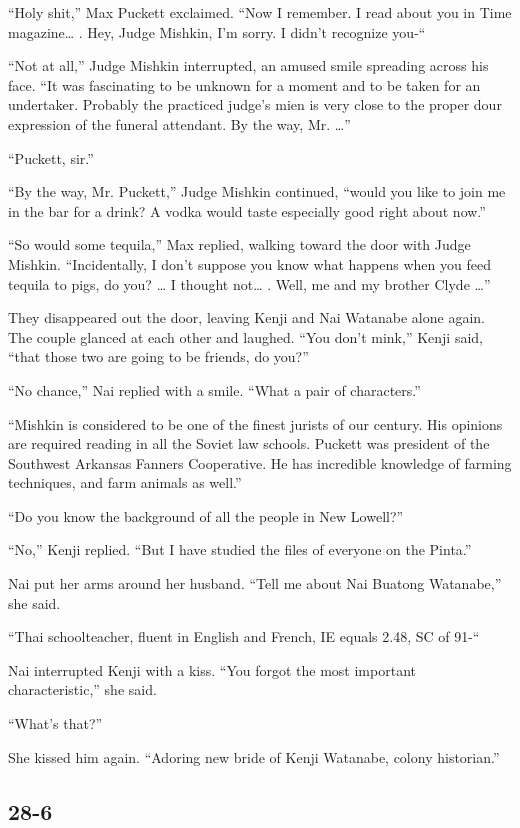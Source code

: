 \documentclass[]{article}
\begin{document}
{“Holy shit,” Max Puckett exclaimed. “Now I remember. I read about you in Time magazine… . Hey, Judge Mishkin, I’m sorry. I didn’t recognize you-“

“Not at all,” Judge Mishkin interrupted, an amused smile spreading across his face. “It was fascinating to be unknown for a moment and to be taken for an undertaker. Probably the practiced judge’s mien is very close to the proper dour expression of the funeral attendant. By the way, Mr. …”

“Puckett, sir.”

“By the way, Mr. Puckett,” Judge Mishkin continued, “would you like to join me in the bar for a drink? A vodka would taste especially good right about now.”

“So would some tequila,” Max replied, walking toward the door with Judge Mishkin. “Incidentally, I don’t suppose you know what happens when you feed tequila to pigs, do you? … I thought not… . Well, me and my brother Clyde …”

They disappeared out the door, leaving Kenji and Nai Watanabe alone again. The couple glanced at each other and laughed. “You don’t mink,” Kenji said, “that those two are going to be friends, do you?”

“No chance,” Nai replied with a smile. “What a pair of characters.”

“Mishkin is considered to be one of the finest jurists of our century. His opinions are required reading in all the Soviet law schools. Puckett was president of the Southwest Arkansas Fanners Cooperative. He has incredible knowledge of farming techniques, and farm animals as well.”

“Do you know the background of all the people in New Lowell?”

“No,” Kenji replied. “But I have studied the files of everyone on the Pinta.”

Nai put her arms around her husband. “Tell me about Nai Buatong Watanabe,” she said.

“Thai schoolteacher, fluent in English and French, IE equals 2.48, SC of 91-“

Nai interrupted Kenji with a kiss. “You forgot the most important characteristic,” she said.

“What’s that?”

She kissed him again. “Adoring new bride of Kenji Watanabe, colony historian.”


\subsection{28-6}

}
\end{document}

